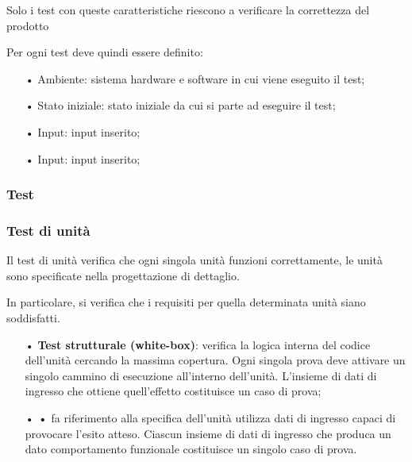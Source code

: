Solo i test con queste caratteristiche riescono a verificare la correttezza del prodotto 

Per ogni test deve quindi essere definito: 
\begin{itemize}
\item[•] Ambiente: sistema hardware e software in cui viene eseguito il test; 
\item[•]Stato iniziale: stato iniziale da cui si parte ad eseguire il test; 
\item[•] Input: input inserito;
\item[•] Input: input inserito;
\end{itemize}

\subsubsection{Test}

\subsubsection{Test di unità}
Il test di unità verifica che ogni singola unità funzioni correttamente, le unità sono specificate nella progettazione di dettaglio.  

In particolare, si verifica che i requisiti per quella determinata unità siano soddisfatti.
\begin{itemize}
\item[•] \textbf{Test strutturale (white-box)}: verifica la logica interna del codice dell’unità cercando la massima copertura. Ogni singola prova deve attivare un singolo cammino di esecuzione all’interno dell’unità. L’insieme di dati di ingresso che ottiene quell’effetto costituisce un caso di prova;
\item[•] \textbf{•} fa riferimento alla specifica dell’unità utilizza dati di ingresso capaci di provocare l’esito atteso. Ciascun insieme di dati di ingresso che produca un dato comportamento funzionale costituisce un singolo caso di prova.
\end{itemize}

